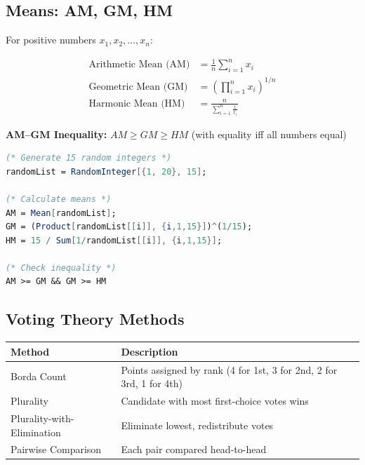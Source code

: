 \documentclass[12pt,a4paper]{article}
\begin{document}
\subsection{Means: AM, GM, HM}

\begin{definitionbox}
    For positive numbers \(x_1, x_2, \ldots, x_n\):
    
    \begin{align*}
    \text{Arithmetic Mean (AM)} &= \frac{1}{n}\sum_{i=1}^n x_i \\
    \text{Geometric Mean (GM)} &= \left(\prod_{i=1}^n x_i\right)^{1/n} \\
    \text{Harmonic Mean (HM)} &= \frac{n}{\sum_{i=1}^n \frac{1}{x_i}}
    \end{align*}
    
    \textbf{AM–GM Inequality:} \(AM \geq GM \geq HM\) (with equality iff all numbers equal)
\end{definitionbox}

\begin{mathematicabox}
    \begin{lstlisting}[language=Mathematica, basicstyle=\ttfamily\small]
(* Generate 15 random integers *)
randomList = RandomInteger[{1, 20}, 15];

(* Calculate means *)
AM = Mean[randomList];
GM = (Product[randomList[[i]], {i,1,15}])^(1/15);
HM = 15 / Sum[1/randomList[[i]], {i,1,15}];

(* Check inequality *)
AM >= GM && GM >= HM
    \end{lstlisting}
\end{mathematicabox}

\subsection{Voting Theory Methods}

\begin{definitionbox}
    \begin{tabular}{|p{3cm}|p{10cm}|}
        \hline
        \textbf{Method} & \textbf{Description} \\
        \hline
        Borda Count & Points assigned by rank (4 for 1st, 3 for 2nd, 2 for 3rd, 1 for 4th) \\
        Plurality & Candidate with most first-choice votes wins \\
        Plurality-with-Elimination & Eliminate lowest, redistribute votes \\
        Pairwise Comparison & Each pair compared head-to-head \\
        \hline
    \end{tabular}
\end{definitionbox}
\end{document}
